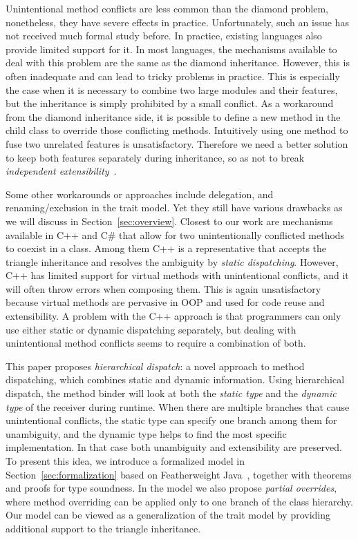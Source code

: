 Unintentional method conflicts are less common than the diamond
problem, nonetheless, they have severe effects in practice. 
Unfortunately, such an issue has not received much formal study 
before. In practice, existing languages also provide limited support for
it. In most languages, the mechanisms available to deal with this problem are the same as the diamond
inheritance. However, this is often inadequate and can lead 
to tricky problems in practice. This is especially the case
when it is necessary to combine two large modules and their features,
but the inheritance is simply prohibited by a small conflict. As
a workaround from the diamond inheritance side, it is possible to
define a new method in the child class to override those conflicting
methods. Intuitively using one method to fuse two unrelated features
is unsatisfactory. Therefore we need a better solution to keep both
features separately during inheritance, so as not to break
\emph{independent extensibility}~\cite{zenger05independentlyextensible}.

Some other workarounds or approaches include delegation, and
renaming/exclusion in the trait model. Yet they still have various
drawbacks as we will discuss in Section~\ref{sec:overview}. Closest to our work
are mechanisms available in C++ and C\# that allow for two
unintentionally conflicted methods to coexist in a class. Among them
C++ is a representative that accepts the triangle inheritance and
resolves the ambiguity by \emph{static dispatching}. However, C++ has
limited support for virtual methods with unintentional conflicts, and
it will often throw errors when composing them. This is again
unsatisfactory because virtual methods are pervasive in OOP and used 
for code reuse and extensibility. A problem with the C++ approach is
that programmers can only use either static or dynamic dispatching separately, but dealing
with unintentional method conflicts seems to require a combination of both. 


This paper proposes \textit{hierarchical dispatch}: a novel approach
to method dispatching, which combines static and dynamic
information. Using hierarchical dispatch, the method binder will look
at both the \emph{static type} and the \emph{dynamic type} of the
receiver during runtime. When there are multiple branches that cause
unintentional conflicts, the static type can specify one branch among
them for unambiguity, and the dynamic type helps to find the most
specific implementation. In that case both unambiguity and
extensibility are preserved. To present this idea, we introduce a
formalized model \MIM{} in Section~\ref{sec:formalization} based on
Featherweight Java~\cite{Igarashi01FJ}, together with theorems and
proofs for type soundness. In the model we also propose
\textit{partial overrides}, where method overriding can be applied
only to one branch of the class hierarchy. Our model can be viewed as
a generalization of the trait model by providing additional support to
the triangle inheritance.

